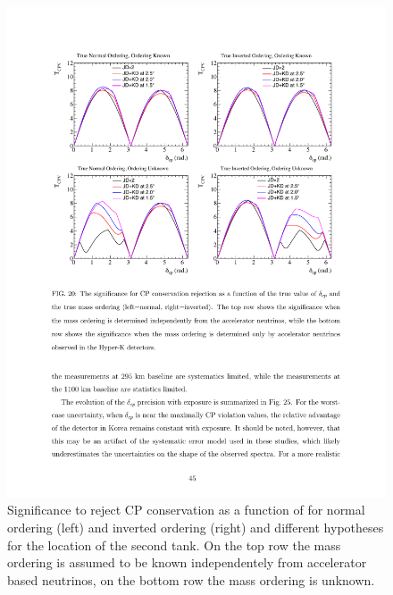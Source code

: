 \begin{figure} [htbp!]
\begin{center}
\includegraphics[width=15cm]{figures/hk_cpv_sensi.pdf}
\caption{\label{fig:hkcpv} Significance to reject CP conservation as a function of \dcp for normal ordering (left) and inverted ordering (right) and different hypotheses for the location of the second tank. On the top row the mass ordering is assumed to be known independentely from accelerator based neutrinos, on the bottom row the mass ordering is unknown.}
\end{center}
\end{figure}

